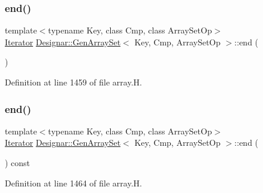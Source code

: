 \subsubsection{\texorpdfstring{end()}{end()}\hspace{0.1cm}{\footnotesize\ttfamily [1/2]}}
{\footnotesize\ttfamily template$<$typename Key, class Cmp, class Array\+Set\+Op$>$ \\
\hyperlink{class_designar_1_1_gen_array_set_1_1_iterator}{Iterator} \hyperlink{class_designar_1_1_gen_array_set}{Designar\+::\+Gen\+Array\+Set}$<$ Key, Cmp, Array\+Set\+Op $>$\+::end (\begin{DoxyParamCaption}{ }\end{DoxyParamCaption})\hspace{0.3cm}{\ttfamily [inline]}}



Definition at line 1459 of file array.\+H.

\mbox{\label{class_designar_1_1_gen_array_set_ade46fb4605ffb1e08d6475a7aacd6024}} 
\subsubsection{\texorpdfstring{end()}{end()}\hspace{0.1cm}{\footnotesize\ttfamily [2/2]}}
{\footnotesize\ttfamily template$<$typename Key, class Cmp, class Array\+Set\+Op$>$ \\
\hyperlink{class_designar_1_1_gen_array_set_1_1_iterator}{Iterator} \hyperlink{class_designar_1_1_gen_array_set}{Designar\+::\+Gen\+Array\+Set}$<$ Key, Cmp, Array\+Set\+Op $>$\+::end (\begin{DoxyParamCaption}{ }\end{DoxyParamCaption}) const\hspace{0.3cm}{\ttfamily [inline]}}



Definition at line 1464 of file array.\+H.

\mbox{\label{class_designar_1_1_gen_array_set_a2874b036273f5cc48275bd1242453930}} 
